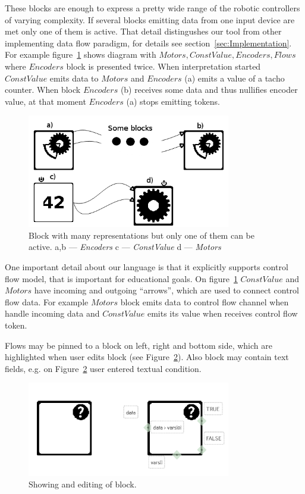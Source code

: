 \documentclass[conference,compsoc]{IEEEtran}
\begin{document}
These blocks are enough to express a pretty wide range of the robotic controllers of varying complexity. If several blocks emitting data from one input device are met only one of them is active. That detail distingushes our tool from other implementing data flow paradigm, for details see section~\ref{sec:Implementation}. For example figure~\ref{image:encoder} shows diagram with $Motors, ConstValue, Encoders, Flows$ where $Encoders$ block is presented twice. When interpretation started $ConstValue$ emits data to $Motors$ and $Encoders$ (a) emits a value of a tacho counter. When block $Encoders$ (b) receives some data and thus nullifies encoder value, at that moment $Encoders$ (a) stops emitting tokens.

\begin{figure}[ht]
	\centering
	\includegraphics[width=3.5in]{Encoders.png}
	\caption{Block with many representations but only one of them can be active. a,b --- \textit{Encoders} c --- \textit{ConstValue} d --- \textit{Motors}}
	\label{image:encoder}
\end{figure}


One important detail about our language is that it explicitly supports control flow model, that is important for educational goals. On figure~\ref{image:encoder} $ConstValue$ and $Motors$ have incoming and outgoing ``arrows'', which are used to connect control flow data. For example $Motors$ block emits data to control flow channel when handle incoming data and $ConstValue$ emits its value when receives control flow token. 

Flows may be pinned to a block on left, right and bottom side, which are highlighted when user edits block (see Figure~\ref{image:block}). Also block may contain text fields, e.g. on Figure~\ref{image:block} user entered textual condition.
\begin{figure}[ht]
	\centering
	\includegraphics[width=3.5in]{block.png}
	\caption{Showing and editing of block.}
	\label{image:block}
\end{figure}
\end{document}
